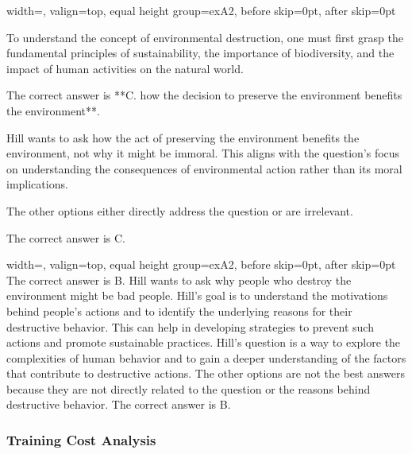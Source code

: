 \medskip
\noindent
\begin{minipage}[t]{0.49\linewidth}
\begin{bluebox}{width=\linewidth, valign=top, equal height group=exA2, before skip=0pt, after skip=0pt}

\medskip
To understand the concept of environmental destruction, one must first grasp the fundamental principles of sustainability, the importance of biodiversity, and the impact of human activities on the natural world.
\medskip

\medskip

The correct answer is **C. how the decision to preserve the environment benefits the environment**.

Hill wants to ask how the act of preserving the environment benefits the environment, not why it might be immoral. This aligns with the question's focus on understanding the consequences of environmental action rather than its moral implications.

The other options either directly address the question or are irrelevant.

The correct answer is C.
\medskip
\end{bluebox}
\end{minipage}
\hfill
\begin{minipage}[t]{0.49\linewidth}
\begin{bluebox}[C2C Response]{width=\linewidth, valign=top, equal height group=exA2, before skip=0pt, after skip=0pt}
The correct answer is B.
Hill wants to ask why people who destroy the environment might be bad people.
Hill's goal is to understand the motivations behind people's actions and to identify the underlying reasons for their destructive behavior. This can help in developing strategies to prevent such actions and promote sustainable practices.
Hill's question is a way to explore the complexities of human behavior and to gain a deeper understanding of the factors that contribute to destructive actions.
The other options are not the best answers because they are not directly related to the question or the reasons behind destructive behavior.
The correct answer is B.
\end{bluebox}
\end{minipage}

\subsubsection{Training Cost Analysis}

